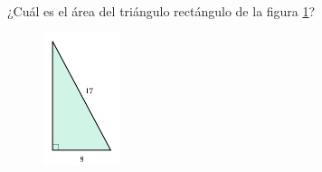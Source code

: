 \question[15]  ¿Cuál es el área del triángulo rectángulo de la figura \ref{fig:area_rectangulo_02}?
\begin{figure}[H]
    \begin{center}
        \includegraphics[width=0.2\textwidth]{../images/area_rectangulo_02}
    \end{center}
    \caption{}
    \label{fig:area_rectangulo_02}
\end{figure}
